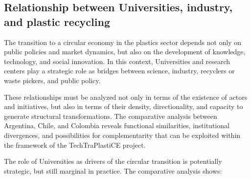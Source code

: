 \documentclass[
  12pt,
  oneside]{book}
\begin{document}
\subsection{Relationship between Universities, industry, and plastic
recycling}\label{relationship-between-universities-industry-and-plastic-recycling}

The transition to a circular economy in the plastics sector depends not
only on public policies and market dynamics, but also on the development
of knowledge, technology, and social innovation. In this context,
Universities and research centers play a strategic role as bridges
between science, industry, recyclers or waste pickers, and public
policy.

These relationships must be analyzed not only in terms of the existence
of actors and initiatives, but also in terms of their density,
directionality, and capacity to generate structural transformations. The
comparative analysis between Argentina, Chile, and Colombia reveals
functional similarities, institutional divergences, and possibilities
for complementarity that can be exploited within the framework of the
TechTraPlastiCE project.

The role of Universities as drivers of the circular transition is
potentially strategic, but still marginal in practice. The comparative
analysis shows:
\end{document}

